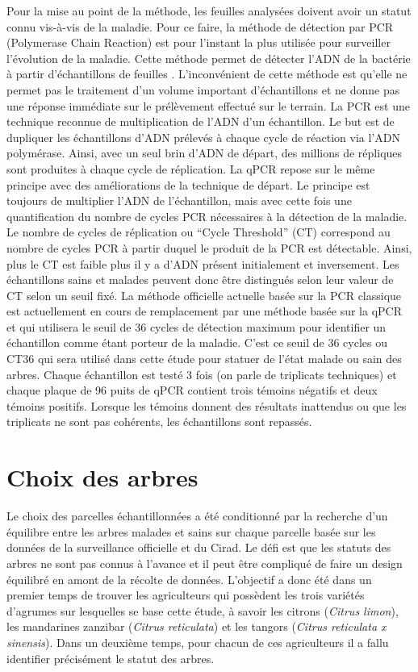 \documentclass[
  11pt,
  french,
  a4paper,
  extrafontsizes,onecolumn,openright
  ]{memoir}
\begin{document}
Pour la mise au point de la méthode, les feuilles analysées doivent avoir un statut connu vis-à-vis de la maladie. Pour ce faire, la méthode de détection par PCR (Polymerase Chain Reaction) est pour l'instant la plus utilisée pour surveiller l'évolution de la maladie. Cette méthode permet de détecter l'ADN de la bactérie à partir d'échantillons de feuilles \autocite{gottwald_current_2010}. L'inconvénient de cette méthode est qu'elle ne permet pas le traitement d'un volume important d'échantillons et ne donne pas une réponse immédiate sur le prélèvement effectué sur le terrain. La PCR est une technique reconnue de multiplication de l'ADN d'un échantillon. Le but est de dupliquer les échantillons d'ADN prélevés à chaque cycle de réaction via l'ADN polymérase. Ainsi, avec un seul brin d'ADN de départ, des millions de répliques sont produites à chaque cycle de réplication. La qPCR repose sur le même principe avec des améliorations de la technique de départ. Le principe est toujours de multiplier l'ADN de l'échantillon, mais avec cette fois une quantification du nombre de cycles PCR nécessaires à la détection de la maladie. Le nombre de cycles de réplication ou ``Cycle Threshold'' (CT) correspond au nombre de cycles PCR à partir duquel le produit de la PCR est détectable. Ainsi, plus le CT est faible plus il y a d'ADN présent initialement et inversement. Les échantillons sains et malades peuvent donc être distingués selon leur valeur de CT selon un seuil fixé.
La méthode officielle actuelle basée sur la PCR classique est actuellement en cours de remplacement par une méthode basée sur la qPCR et qui utilisera le seuil de 36 cycles de détection maximum pour identifier un échantillon comme étant porteur de la maladie. C'est ce seuil de 36 cycles ou CT36 qui sera utilisé dans cette étude pour statuer de l'état malade ou sain des arbres. Chaque échantillon est testé 3 fois (on parle de triplicats techniques) et chaque plaque de 96 puits de qPCR contient trois témoins négatifs et deux témoins positifs. Lorsque les témoins donnent des résultats inattendus ou que les triplicats ne sont pas cohérents, les échantillons sont repassés.

\hypertarget{choix-des-arbres}{%
\section{Choix des arbres}\label{choix-des-arbres}}

Le choix des parcelles échantillonnées a été conditionné par la recherche d'un équilibre entre les arbres malades et sains sur chaque parcelle basée sur les données de la surveillance officielle et du Cirad. Le défi est que les statuts des arbres ne sont pas connus à l'avance et il peut être compliqué de faire un design équilibré en amont de la récolte de données. L'objectif a donc été dans un premier temps de trouver les agriculteurs qui possèdent les trois variétés d'agrumes sur lesquelles se base cette étude, à savoir les citrons (\emph{Citrus limon}), les mandarines zanzibar (\emph{Citrus reticulata}) et les tangors (\emph{Citrus reticulata x sinensis}). Dans un deuxième temps, pour chacun de ces agriculteurs il a fallu identifier précisément le statut des arbres.
\end{document}

